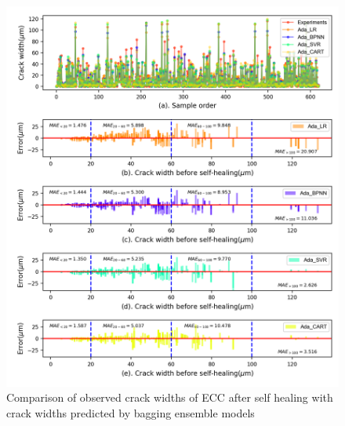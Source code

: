 \documentclass[11pt]{article}
\begin{document}
	\begin{figure}[!h]
		\centering
		\includegraphics[width=\textwidth]{c2.png}
		\caption{Comparison of observed crack widths of ECC after self healing with crack widths predicted by bagging ensemble models}
		\label{error2}
	\end{figure}
	
\end{document}
